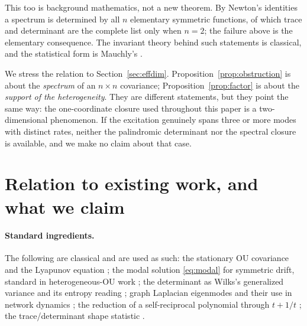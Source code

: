 \documentclass[11pt]{article}
\theoremstyle{plain}
\theoremstyle{definition}
\theoremstyle{remark}
\begin{document}
This too is background mathematics, not a new theorem. By Newton's identities a spectrum is
determined by all $n$ elementary symmetric functions, of which trace and determinant are the
complete list only when $n=2$; the failure above is the elementary consequence. The invariant
theory behind such statements is classical, and the statistical form is Mauchly's
\cite{Mauchly1940,Muirhead1982}.

We stress the relation to Section~\ref{sec:effdim}. Proposition~\ref{prop:obstruction} is about
the \emph{spectrum} of an $n\times n$ covariance; Proposition~\ref{prop:factor} is about the
\emph{support of the heterogeneity}. They are different statements, but they point the same way:
the one-coordinate closure used throughout this paper is a two-dimensional phenomenon. If the
excitation genuinely spans three or more modes with distinct rates, neither the palindromic
determinant nor the spectral closure is available, and we make no claim about that case.

\section{Relation to existing work, and what we claim}\label{sec:priorart}

\paragraph{Standard ingredients.} The following are classical and are used as such: the
stationary OU covariance and the Lyapunov equation \cite{Gardiner2004,Vatiwutipong2019,Simoncini2016};
the modal solution \eqref{eq:modal} for symmetric drift, standard in heterogeneous-OU work
\cite{Barucca2014,GodrecheLuck2019,FerreiraMetzBarucca2025}; the determinant as Wilks's
generalized variance \cite{Wilks1932} and its entropy reading \cite{CoverThomas2005}; graph
Laplacian eigenmodes and their use in network dynamics \cite{BamiehEtAl2012}; the reduction of a
self-reciprocal polynomial through $t+1/t$ \cite{Vieira2019}; the trace/determinant shape
statistic \cite{Mauchly1940,Muirhead1982,WolkowiczStyan1980,HornJohnson2012}.
\end{document}
